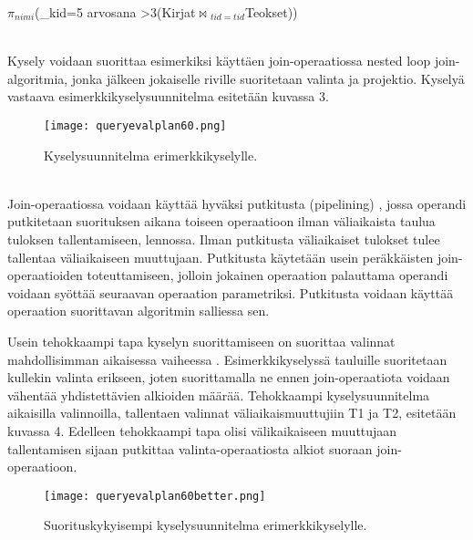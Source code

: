 \documentclass[finnish]{tktltiki2}
\theoremstyle{definition}
\theoremstyle{remark}
\begin{document}
\begin{frame}

$\pi$$_{nimi}$(\sigma_{kid=5 \wedge arvosana \textgreater 3}(Kirjat$\Join$$ _{tid=tid}$Teokset))
\end{frame}
\\\newline
Kysely voidaan suorittaa esimerkiksi käyttäen join-operaatiossa nested loop join-algoritmia, jonka jälkeen jokaiselle riville suoritetaan 
valinta ja projektio. Kyselyä vastaava esimerkkikyselysuunnitelma esitetään kuvassa 3.

\begin{figure}[!h] 
  \caption{Kyselysuunnitelma erimerkkikyselylle.}
  \centering
    \texttt{[image: queryevalplan60.png]}
\end{figure}
\\\newline
Join-operaatiossa voidaan käyttää hyväksi putkitusta (pipelining) \cite{dalvi2001pipelining}, jossa operandi putkitetaan suorituksen aikana toiseen operaatioon ilman väliaikaista taulua tuloksen tallentamiseen, lennossa. Ilman putkitusta väliaikaiset tulokset tulee tallentaa väliaikaiseen muuttujaan. Putkitusta käytetään usein peräkkäisten join-operaatioiden toteuttamiseen, jolloin jokainen operaation palauttama operandi voidaan syöttää seuraavan operaation parametriksi. Putkitusta voidaan käyttää operaation suorittavan algoritmin salliessa sen.

Usein tehokkaampi tapa kyselyn suorittamiseen on suorittaa valinnat mahdollisimman aikaisessa vaiheessa \cite{ramakrishnan2003database}. Esimerkkikyselyssä tauluille suoritetaan kullekin valinta erikseen, joten suorittamalla ne ennen join-operaatiota voidaan vähentää yhdistettävien alkioiden määrää. Tehokkaampi kyselysuunnitelma aikaisilla valinnoilla, tallentaen valinnat väliaikaismuuttujiin T1 ja T2, esitetään kuvassa 4. Edelleen tehokkaampi tapa olisi välikaikaiseen muuttujaan tallentamisen sijaan putkittaa valinta-operaatiosta alkiot suoraan join-operaatioon.

 \begin{figure}[!h] 
  \caption{Suorituskykyisempi kyselysuunnitelma erimerkkikyselylle.}
  \centering
    \texttt{[image: queryevalplan60better.png]}
\end{figure}
\\\newline
%
\end{document}

